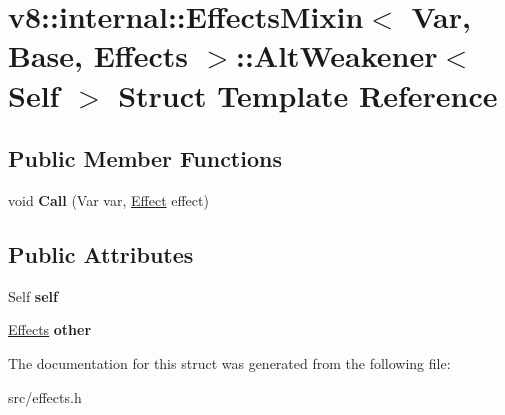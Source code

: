 \hypertarget{structv8_1_1internal_1_1_effects_mixin_1_1_alt_weakener}{}\section{v8\+:\+:internal\+:\+:Effects\+Mixin$<$ Var, Base, Effects $>$\+:\+:Alt\+Weakener$<$ Self $>$ Struct Template Reference}
\label{structv8_1_1internal_1_1_effects_mixin_1_1_alt_weakener}
\subsection*{Public Member Functions}
\begin{DoxyCompactItemize}
\item 
\hypertarget{structv8_1_1internal_1_1_effects_mixin_1_1_alt_weakener_a651cd436a421f5b78abc43754e8309a3}{}void {\bfseries Call} (Var var, \hyperlink{structv8_1_1internal_1_1_effect}{Effect} effect)\label{structv8_1_1internal_1_1_effects_mixin_1_1_alt_weakener_a651cd436a421f5b78abc43754e8309a3}

\end{DoxyCompactItemize}
\subsection*{Public Attributes}
\begin{DoxyCompactItemize}
\item 
\hypertarget{structv8_1_1internal_1_1_effects_mixin_1_1_alt_weakener_ae73da3655748ec9da62f755efd66633a}{}Self {\bfseries self}\label{structv8_1_1internal_1_1_effects_mixin_1_1_alt_weakener_ae73da3655748ec9da62f755efd66633a}

\item 
\hypertarget{structv8_1_1internal_1_1_effects_mixin_1_1_alt_weakener_adde1918061d0bb8bd6148becfeef5e84}{}\hyperlink{classv8_1_1internal_1_1_effects}{Effects} {\bfseries other}\label{structv8_1_1internal_1_1_effects_mixin_1_1_alt_weakener_adde1918061d0bb8bd6148becfeef5e84}

\end{DoxyCompactItemize}


The documentation for this struct was generated from the following file\+:\begin{DoxyCompactItemize}
\item 
src/effects.\+h\end{DoxyCompactItemize}

